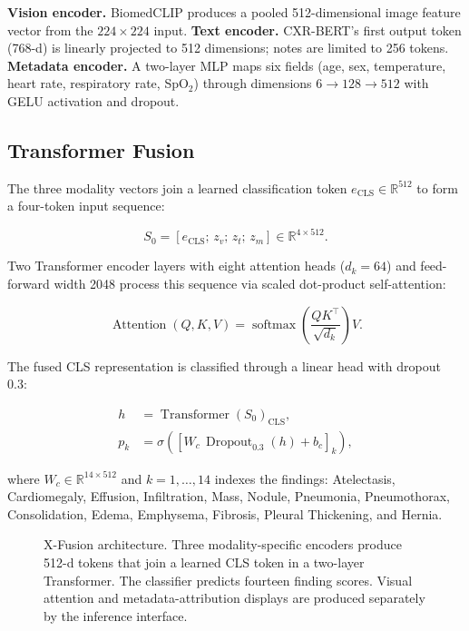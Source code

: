 \documentclass[runningheads,a4paper]{llncs}
\begin{document}
\noindent
\textbf{Vision encoder.} BiomedCLIP produces a pooled 512-dimensional image feature vector from the $224\times224$ input.
\textbf{Text encoder.} CXR-BERT's first output token (768-d) is linearly projected to 512 dimensions; notes are limited to 256 tokens.
\textbf{Metadata encoder.} A two-layer MLP maps six fields (age, sex, temperature, heart rate, respiratory rate, SpO$_2$) through dimensions $6\!\to\!128\!\to\!512$ with GELU activation and dropout.

\subsection{Transformer Fusion}

The three modality vectors join a learned classification token $e_\mathrm{CLS}\in\mathbb{R}^{512}$ to form a four-token input sequence:

\begin{equation}
S_0 = [e_{\mathrm{CLS}};\, z_v;\, z_t;\, z_m]
\in\mathbb{R}^{4\times 512}.
\end{equation}

Two Transformer encoder layers with eight attention heads ($d_k\!=\!64$) and feed-forward width 2048 process this sequence via scaled dot-product self-attention:

\begin{equation}
\operatorname{Attention}(Q,K,V)=
\operatorname{softmax}
\!\left(\frac{QK^\top}{\sqrt{d_k}}\right)\!V.
\end{equation}

The fused CLS representation is classified through a linear head with dropout 0.3:

\begin{equation}
\begin{aligned}
h &= \operatorname{Transformer}(S_0)_{\mathrm{CLS}},\\
p_k &= \sigma\!\left(
\left[W_c\,\operatorname{Dropout}_{0.3}(h)+b_c\right]_k
\right),
\end{aligned}
\end{equation}

\noindent where $W_c\in\mathbb{R}^{14\times 512}$ and $k=1,\ldots,14$ indexes the findings: Atelectasis, Cardiomegaly, Effusion, Infiltration, Mass, Nodule, Pneumonia, Pneumothorax, Consolidation, Edema, Emphysema, Fibrosis, Pleural Thickening, and Hernia.

\begin{figure}[t]
\centering
\resizebox{\linewidth}{!}{}
\caption{X-Fusion architecture. Three modality-specific encoders produce 512-d tokens that join a learned CLS token in a two-layer Transformer. The classifier predicts fourteen finding scores. Visual attention and metadata-attribution displays are produced separately by the inference interface.}
\label{fig:architecture}
\end{figure}
\end{document}
